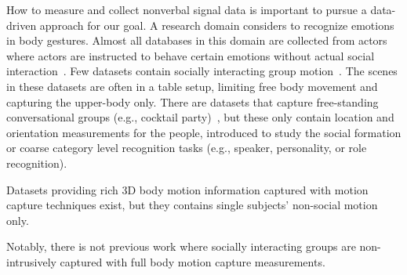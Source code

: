 

How to measure and collect nonverbal signal data is important to pursue a data-driven approach for our goal.  A research domain considers to recognize emotions in body gestures. Almost all databases in this domain are collected from actors where actors are instructed to behave certain emotions without actual social interaction~\cite{gunes2006bimodal, banziger2012introducing, de2004modeling}. Few datasets contain socially interacting group motion~\cite{mccowan2005ami, zancanaro2006automatic, lepri2012connecting, rehg2013decoding}. The scenes in these datasets are often in a table setup, limiting free body movement and capturing the upper-body only. There are datasets that capture free-standing conversational groups (e.g., cocktail party)~\cite{Zen-10, Cristani-11, alameda2016salsa, farenzena2009social}, but these only contain location and orientation measurements for the people, introduced to study the social formation or coarse category level recognition tasks (e.g., speaker, personality, or role recognition).


Datasets providing rich 3D body motion information captured with motion capture techniques exist, but they contains single subjects' non-social motion only\cite{gross2001cmu, h36m_pami, sigal2010humaneva}. 

Notably, there is not previous work where socially interacting groups are non-intrusively captured with full body motion capture measurements. 


